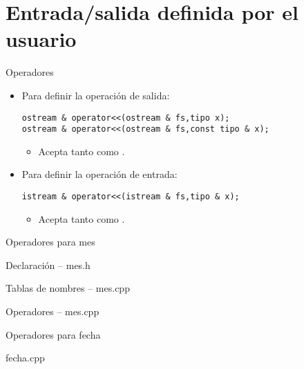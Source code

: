 \section{Entrada/salida definida por el usuario}

\begin{frame}[fragile]{Operadores}
\begin{itemize}
  \item Para definir la operación de salida:
\begin{lstlisting}
ostream & operator<<(ostream & fs,tipo x);
ostream & operator<<(ostream & fs,const tipo & x);
\end{lstlisting}
    \begin{itemize}
      \item Acepta tanto  como .
    \end{itemize}
  \item Para definir la operación de entrada:
\begin{lstlisting}
istream & operator<<(istream & fs,tipo & x);
\end{lstlisting}
    \begin{itemize}
      \item Acepta tanto  como .
    \end{itemize}
\end{itemize}
\end{frame}

\begin{frame}{Operadores para mes}
\begin{block}{Declaración -- mes.h}

\end{block}
\begin{block}{Tablas de nombres -- mes.cpp}

\end{block}
\end{frame}

\begin{frame}
\begin{block}{Operadores -- mes.cpp}
\mode<presentation>{

}
\end{block}
\end{frame}

\begin{frame}{Operadores para fecha}
\begin{block}{fecha.cpp}

\end{block}
\end{frame}

